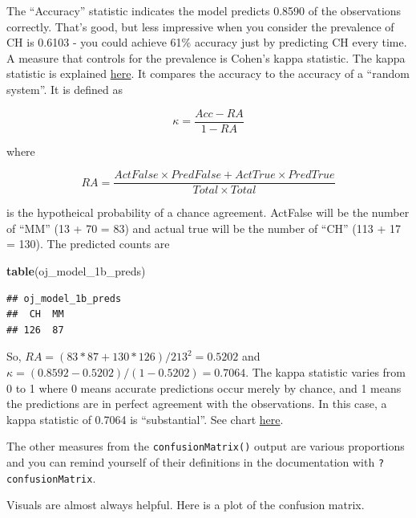 \documentclass[
]{book}
\newenvironment{Shaded}{\begin{snugshade}}{\end{snugshade}}
\newcommand{\DataTypeTok}[1]{\textcolor[rgb]{0.13,0.29,0.53}{#1}}
\newcommand{\KeywordTok}[1]{\textcolor[rgb]{0.13,0.29,0.53}{\textbf{#1}}}
\newcommand{\NormalTok}[1]{#1}
\newcommand{\OperatorTok}[1]{\textcolor[rgb]{0.81,0.36,0.00}{\textbf{#1}}}
\newcommand{\StringTok}[1]{\textcolor[rgb]{0.31,0.60,0.02}{#1}}
\begin{document}
The ``Accuracy'' statistic indicates the model predicts 0.8590 of the observations correctly. That's good, but less impressive when you consider the prevalence of CH is 0.6103 - you could achieve 61\% accuracy just by predicting CH every time. A measure that controls for the prevalence is Cohen's kappa statistic. The kappa statistic is explained \href{https://standardwisdom.com/softwarejournal/2011/12/confusion-matrix-another-single-value-metric-kappa-statistic/}{here}. It compares the accuracy to the accuracy of a ``random system''. It is defined as

\[\kappa = \frac{Acc - RA}{1-RA}\]

where

\[RA = \frac{ActFalse \times PredFalse + ActTrue \times PredTrue}{Total \times Total}\]

is the hypotheical probability of a chance agreement. ActFalse will be the number of ``MM'' (13 + 70 = 83) and actual true will be the number of ``CH'' (113 + 17 = 130). The predicted counts are

\begin{Shaded}
\begin{Highlighting}[]
\KeywordTok{table}\NormalTok{(oj_model_1b_preds)}
\end{Highlighting}
\end{Shaded}

\begin{verbatim}
## oj_model_1b_preds
##  CH  MM 
## 126  87
\end{verbatim}

So, \(RA = (83*87 + 130*126) / 213^2 = 0.5202\) and \(\kappa = (0.8592 - 0.5202)/(1 - 0.5202) = 0.7064\). The kappa statistic varies from 0 to 1 where 0 means accurate predictions occur merely by chance, and 1 means the predictions are in perfect agreement with the observations. In this case, a kappa statistic of 0.7064 is ``substantial''. See chart \href{https://www.statisticshowto.datasciencecentral.com/cohens-kappa-statistic/}{here}.

The other measures from the \texttt{confusionMatrix()} output are various proportions and you can remind yourself of their definitions in the documentation with \texttt{?confusionMatrix}.

Visuals are almost always helpful. Here is a plot of the confusion matrix.

\begin{Shaded}
\end{Shaded}
\end{document}
